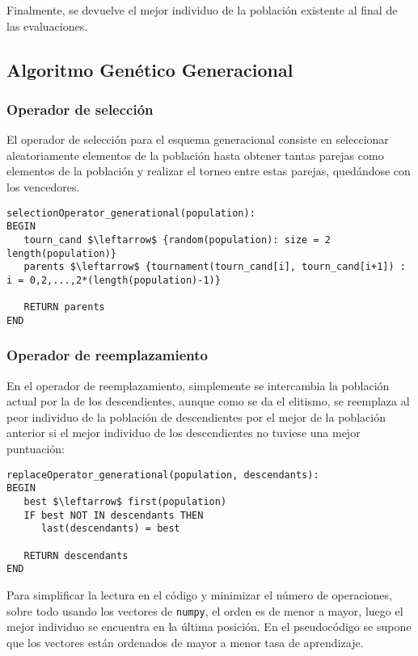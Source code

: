 \documentclass[11pt,leqno]{article}
\begin{document}
	Finalmente, se devuelve el mejor individuo de la población existente al final de las evaluaciones. 

\subsection{Algoritmo Genético Generacional}

\subsubsection{Operador de selección}

	El operador de selección para el esquema generacional consiste en seleccionar aleatoriamente elementos de la población hasta obtener tantas parejas como elementos de la población y realizar el torneo entre estas parejas, quedándose con los vencedores.
	
\begin{lstlisting}[mathescape=true]
selectionOperator_generational(population):
BEGIN
   tourn_cand $\leftarrow$ {random(population): size = 2 length(population)}
   parents $\leftarrow$ {tournament(tourn_cand[i], tourn_cand[i+1]) : i = 0,2,...,2*(length(population)-1)}
   
   RETURN parents
END
\end{lstlisting}

\subsubsection{Operador de reemplazamiento}

	En el operador de reemplazamiento, simplemente se intercambia la población actual por la de los descendientes, aunque como se da el elitismo, se reemplaza al peor individuo de la población de descendientes por el mejor de la población anterior si el mejor individuo de los descendientes no tuviese una mejor puntuación:
	
\begin{lstlisting}[mathescape=true]
replaceOperator_generational(population, descendants):
BEGIN
   best $\leftarrow$ first(population)
   IF best NOT IN descendants THEN
      last(descendants) = best
   
   RETURN descendants
END
\end{lstlisting}

Para simplificar la lectura en el código y minimizar el número de operaciones, sobre todo usando los vectores de \texttt{numpy}, el orden es de menor a mayor, luego el mejor individuo se encuentra en la última posición. En el pseudocódigo se supone que los vectores están ordenados de mayor a menor tasa de aprendizaje.
\end{document}
